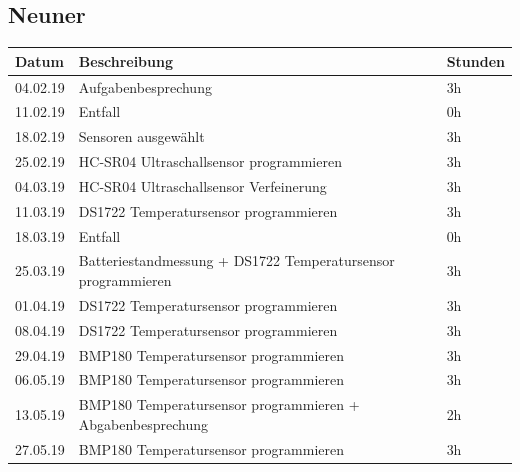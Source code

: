 \documentclass[12pt,a4paper,german]{article}
\begin{document}
\subsection{Neuner}

\begin{table}[H]
\centering 
\begin{tabularx}{\textwidth}{|l|X|l|}
\hline
\textbf{Datum} & \textbf{Beschreibung} & \textbf{Stunden} \\ 
\hline
\hline
04.02.19 & Aufgabenbesprechung & 3h \\ 
\hline
11.02.19 & Entfall & 0h \\ 
\hline
18.02.19 & Sensoren ausgewählt & 3h \\ 
\hline
25.02.19 & HC-SR04 Ultraschallsensor programmieren & 3h \\ 
\hline
04.03.19 & HC-SR04 Ultraschallsensor Verfeinerung & 3h \\ 
\hline
11.03.19 & DS1722 Temperatursensor programmieren & 3h \\ 
\hline
18.03.19 & Entfall & 0h\\ 
\hline
25.03.19 & Batteriestandmessung + DS1722 Temperatursensor programmieren & 3h \\ 
\hline
01.04.19 & DS1722 Temperatursensor programmieren& 3h \\ 
\hline
08.04.19 & DS1722 Temperatursensor programmieren & 3h \\ 
\hline
29.04.19 & BMP180 Temperatursensor programmieren & 3h \\ 
\hline
06.05.19 & BMP180 Temperatursensor programmieren & 3h \\ 
\hline
13.05.19 & BMP180 Temperatursensor programmieren + Abgabenbesprechung & 2h \\ 
\hline
27.05.19 & BMP180 Temperatursensor programmieren & 3h \\ 
\hline
\end{tabularx}
\end{table}
\end{document}
